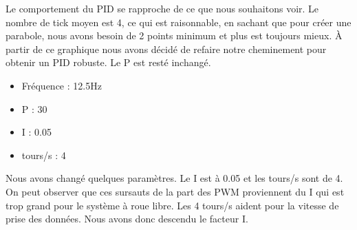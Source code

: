 \documentclass[
	a4paper,									%
	11pt,										%
	twoside,									%
	openright,									%
	notitlepage,									%
	parskip=half,								%
]{scrreprt}										%
\begin{document}
Le comportement du PID se rapproche de ce que nous souhaitons voir. Le nombre de tick moyen est 4, ce qui est raisonnable, 
en sachant que pour créer une parabole, nous avons besoin de 2 points minimum et plus est toujours mieux. À partir de ce 
graphique nous avons décidé de refaire notre cheminement pour obtenir un PID robuste. Le P est resté inchangé. \par

\begin{center}
    
    
    \begin{itemize}
        \item Fréquence : 12.5Hz
        \item P : 30
        \item I : 0.05
        \item tours/s : 4
    \end{itemize}
    \end{center}

    Nous avons changé quelques paramètres. Le I est à 0.05 et les tours/s sont de 4. On peut observer 
que ces sursauts de la part des PWM proviennent du I qui est trop grand pour le système à roue libre. 
Les 4 tours/s aident pour la vitesse de prise des données. Nous avons donc descendu le facteur I. \par
\end{document}
